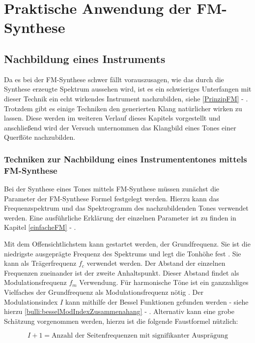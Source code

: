 \section{Praktische Anwendung der FM-Synthese}
\FloatBarrier
\subsection{Nachbildung eines Instruments}
Da es bei der FM-Synthese schwer fällt vorauszusagen, wie das durch die Synthese erzeugte Spektrum aussehen wird, ist es ein schwieriges Unterfangen mit dieser Technik ein echt wirkendes Instrument nachzubilden, siehe \ref{PrinzipFM} - .
Trotzdem gibt es einige Techniken den generierten Klang natürlicher wirken zu lassen. Diese werden im weiteren Verlauf dieses Kapitels vorgestellt und anschließend wird der Versuch unternommen das Klangbild eines Tones einer Querflöte nachzubilden.

\FloatBarrier
\subsubsection{Techniken zur Nachbildung eines Instrumententones mittels FM-Synthese}

Bei der Synthese eines Tones mittels FM-Synthese müssen zunächst die Parameter der FM-Synthese Formel festgelegt werden. Hierzu kann das Frequenzspektrum und das Spektrogramm des nachzubildenden Tones verwendet werden. Eine ausführliche Erklärung der einzelnen Parameter ist zu finden in Kapitel \ref{einfacheFM} - . 

Mit dem Offensichtlichstem kann gestartet werden, der Grundfrequenz. Sie ist die niedrigste ausgeprägte Frequenz des Spektrums und legt die Tonhöhe fest \cite[S. 53]{barkowsky}. Sie kann als Trägerfrequenz $f_c$ verwendet werden. Der Abstand der einzelnen Frequenzen zueinander ist der zweite Anhaltspunkt. Dieser Abstand findet als Modulationsfrequenz $f_m$ Verwendung. Für harmonische Töne ist ein ganzzahliges Vielfaches der Grundfrequenz als Modulationsfrequenz nötig \cite[S. 528]{chowningPaper}. Der Modulationsindex $I$ kann mithilfe der Bessel Funktionen gefunden werden - siehe hierzu \ref{bulli:besselModIndexZusammenahang} - . Alternativ kann eine grobe Schätzung vorgenommen werden, hierzu ist die folgende Faustformel nützlich:

\begin{equation}
\label{eq:faustformel}
I + 1 = \text{Anzahl der Seitenfrequenzen mit signifikanter Ausprägung}
\end{equation}

